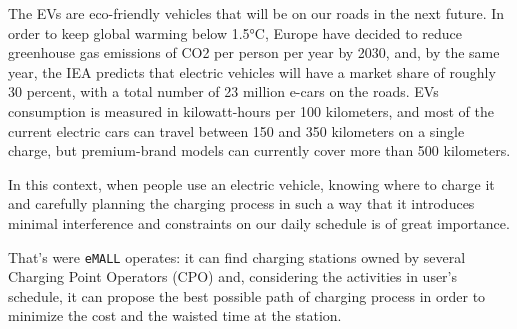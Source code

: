 \documentclass[11pt]{article}
\begin{document}
    The EVs are eco-friendly vehicles that will be on our roads in the next future.
    In order to keep global warming below 1.5°C, Europe have decided to reduce greenhouse gas emissions of CO2 per
    person per year by 2030, and, by the same year, the IEA predicts that electric vehicles will have a market share
    of roughly 30 percent, with a total number of 23 million e-cars on the roads.
    EVs consumption is measured in kilowatt-hours per 100 kilometers, and most of the current electric cars can travel
    between 150 and 350 kilometers on a single charge, but premium-brand models can currently cover more than 500
    kilometers.



    In this context, when people use an electric vehicle, knowing where to charge it and carefully planning the
    charging process in such a way that it introduces minimal interference and constraints on our daily schedule
    is of great importance.

    That's were \verb|eMALL| operates: it can find charging stations owned by several Charging Point Operators (CPO) and,
    considering the activities in user's schedule, it can propose the best possible path of charging process
    in order to minimize the cost and the waisted time at the station.

\end{document}
